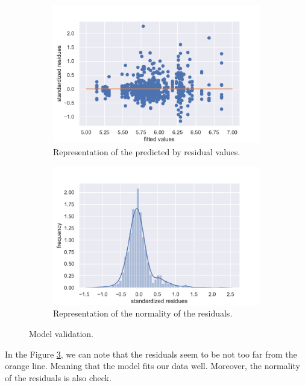 \documentclass{article}
\begin{document}
\begin{figure}[H]
\centering
\begin{subfigure}{.5\textwidth}
  \centering
  \includegraphics[width=1\linewidth]{./images/homo_mod2.pdf}
  \caption{Representation of the predicted by residual values.}
  \label{fig:homo_mod2}
\end{subfigure}%
\begin{subfigure}{.5\textwidth}
  \centering
  \includegraphics[width=1\linewidth, clip,trim={0cm 0cm 0cm 0.6cm} ]{./images/resid_norm_m2.pdf}
  \caption{Representation of the normality of the residuals.}
  \label{fig:resid_}
\end{subfigure}
\caption{Model validation.}
\label{fig:valid_2}
\end{figure}

In the Figure \ref{fig:valid_2}, we can note that the residuals seem to be not too far from the orange line. Meaning that the model fits our data well.
Moreover, the normality of the residuals is also check.
\end{document}
